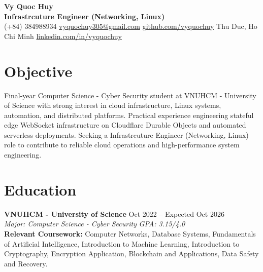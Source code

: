 \documentclass[10pt,a4paper]{article}
\begin{document}
\pagestyle{empty}

\begin{center}
    {\huge \textbf{Vy Quoc Huy}} \\ \vspace{4pt}
    {\Large \textbf{Infrastrcuture Engineer (Networking, Linux)}} \\ \vspace{4pt}
    (+84) 384988934 \quad \href{mailto:vyquochuy305@gmail.com}{vyquochuy305@gmail.com} \quad \href{https://github.com/vyquochuy}{github.com/vyquochuy} \quad Thu Duc, Ho Chi Minh \quad \href{https://www.linkedin.com/in/vyquochuy/}{linkedin.com/in/vyquochuy}
\end{center}

\section*{Objective}
Final-year Computer Science - Cyber Security student at VNUHCM - University of Science with strong interest in cloud infrastructure, Linux systems, automation, and distributed platforms. Practical experience engineering stateful edge WebSocket infrastructure on Cloudflare Durable Objects and automated serverless deployments. Seeking a Infrastrcuture Engineer (Networking, Linux) role to contribute to reliable cloud operations and high-performance system engineering.

\section*{Education}
\noindent \textbf{VNUHCM - University of Science} \hfill Oct 2022 -- Expected Oct 2026\\
\textit{Major: Computer Science - Cyber Security} \hfill \textit{GPA: 3.15/4.0}\\
\textbf{Relevant Coursework:} Computer Networks, Database Systems, Fundamentals of Artificial Intelligence, Introduction to Machine Learning, Introduction to Cryptography, Encryption Application, Blockchain and Applications, Data Safety and Recovery.

\end{document}
